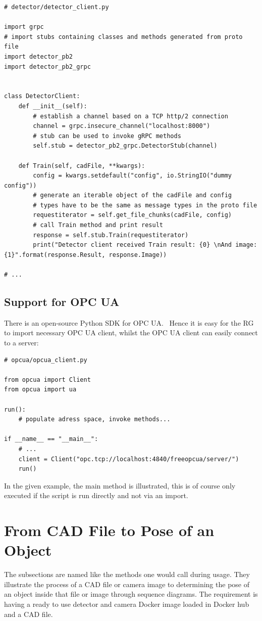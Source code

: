 \begin{verbatim}
# detector/detector_client.py

import grpc
# import stubs containing classes and methods generated from proto file
import detector_pb2
import detector_pb2_grpc


class DetectorClient:
    def __init__(self):
        # establish a channel based on a TCP http/2 connection
        channel = grpc.insecure_channel("localhost:8000")
        # stub can be used to invoke gRPC methods
        self.stub = detector_pb2_grpc.DetectorStub(channel)
    
    def Train(self, cadFile, **kwargs):
        config = kwargs.setdefault("config", io.StringIO("dummy config"))
        # generate an iterable object of the cadFile and config
        # types have to be the same as message types in the proto file
        requestiterator = self.get_file_chunks(cadFile, config)
        # call Train method and print result
        response = self.stub.Train(requestiterator)
        print("Detector client received Train result: {0} \nAnd image: {1}".format(response.Result, response.Image))
        
# ...
\end{verbatim}

\subsection{Support for OPC UA}
There is an open-source Python SDK for OPC UA.~\cite{FreeOpcUa-Documentation2019OPC2019} Hence it is easy for the RG to import necessary OPC UA client, whilst the OPC UA client can easily connect to a server:
\begin{verbatim}
# opcua/opcua_client.py

from opcua import Client
from opcua import ua

run():
    # populate adress space, invoke methods...

if __name__ == "__main__":
    # ...
    client = Client("opc.tcp://localhost:4840/freeopcua/server/")
    run()
\end{verbatim}

In the given example, the main method is illustrated, this is of course only executed if the script is run directly and not via an import.

\section{From CAD File to Pose of an Object}
The subsections are named like the methods one would call during usage. They illustrate the process of a CAD file or camera image to determining the pose of an object inside that file or image through sequence diagrams. The requirement is having a ready to use detector and camera Docker image loaded in Docker hub and a CAD file. 

